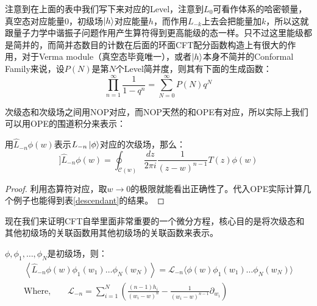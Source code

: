 注意到在上面的表中我们写下来对应的Level，注意到$L_0$可看作体系的哈密顿量，真空态对应能量0，初级场$\ket{h}$对应能量$h$，而作用$L_{-k}$上去会把能量加$k$，所以这就跟量子力学中谐振子问题作用产生算符得到更高能级的态一样。只不过这里能级都是简并的，而简并态数目的计数在后面的环面CFT配分函数构造上有很大的作用，对于Verma module（真空态毕竟唯一），或者$\ket{h}$本身不简并的Conformal Family来说，设$P(N)$是第$N$个Level简并度，则其有下面的生成函数：
\begin{equation}
	\boxed{
		\prod_{n=1}^\infty\frac1{1-q^n}=\sum_{N=0}^\infty P(N)q^N
	}
\end{equation}

次级态和次级场之间用NOP对应，而NOP天然的和OPE有对应，所以实际上我们可以用OPE的围道积分来表示：
\begin{theorem}
	用$\widehat{L}_{-n}\phi(w)$表示$L_{-n}\ket\phi$对应的次级场，那么：
	\begin{equation}\label{eq:33.30}]
		\boxed{
			\widehat{L}_{-n}\phi(w)=\oint_{\mathcal{C}(w)}\frac{dz}{2\pi i}\frac1{(z-w)^{n-1}}T(z)\phi(w)
		}
	\end{equation}
\end{theorem}
\begin{proof}
	利用态算符对应，取$w\to 0$的极限就能看出正确性了。代入OPE实际计算几个例子也能得到表\ref{descendant}的结果。
\end{proof}
现在我们来证明CFT自举里面非常重要的一个微分方程，核心目的是将次级态和其他初级场的关联函数用其他初级场的关联函数来表示。
\begin{theorem}
	$\phi,\phi_1,\ldots,\phi_N$是初级场，则：
	\begin{equation}\label{33.31}
		\boxed{
			\begin{gathered}
				\left\langle\widehat{L}_{-n}\phi(w)\phi_{1}(w_{1})\ldots\phi_{N}(w_{N})\right\rangle=\mathcal{L}_{-n}\langle\phi(w)\phi_{1}(w_{1})\ldots\phi_{N}(w_{N})\rangle  \\
				\text{Where,}\qquad\mathcal{L}_{-n}=\sum_{i=1}^N\left(\frac{(n-1)h_i}{(w_i-w)^n}-\frac1{(w_i-w)^{n-1}}\partial_{w_i}\right)
			\end{gathered}
		}
	\end{equation}
\end{theorem}
